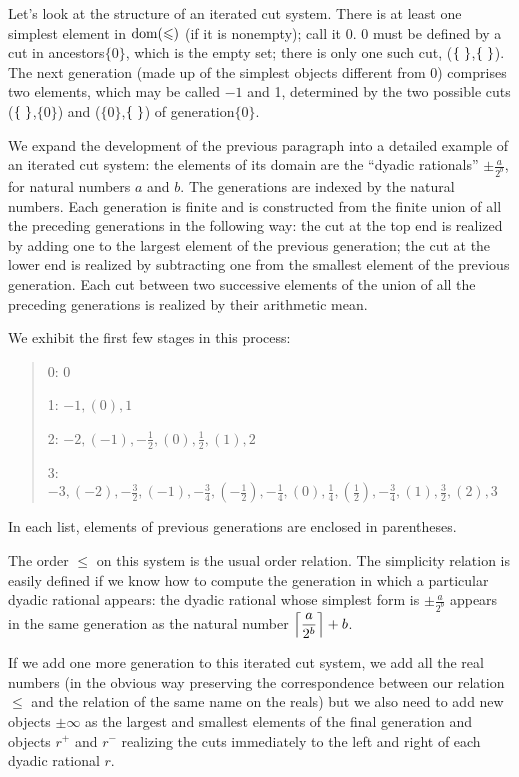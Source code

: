 Let's look at the structure of an iterated cut system.  There
is at least one simplest element in $\mathop{\mathrm{dom}}(\leqslant)$ (if it is nonempty);
call it 0.  0 must be defined by a cut in ancestors$\{0\}$, which is
the empty set; there is only one such cut,
($\mbox{$\{\;\}$}$,$\mbox{$\{\;\}$}$). The next generation (made up of the simplest objects
different from 0) comprises two elements, which may be called $-1$ and
1, determined by the two possible cuts ($\mbox{$\{\;\}$}$,$\{0\}$) and
($\{0\}$,$\mbox{$\{\;\}$}$) of generation$\{0\}$.

We expand the development of the previous paragraph into a detailed
example of an iterated cut system: the elements of its domain are the
``dyadic rationals'' $\displaystyle\pm\frac
a{2^b}$, for
natural numbers $a$ and $b$.  The generations are indexed by the natural
numbers.  Each generation is finite and is constructed from
the finite union of all
the preceding generations in the following way: the cut at the top end
is realized by adding one to the largest element of the previous
generation; the cut at the lower end is realized by subtracting one
from the smallest element of the previous generation.  Each cut
between two successive elements of the union of all the preceding
generations is realized by their arithmetic mean.

We exhibit the first few stages in this process:
\begin{quote}
 0:  0

 1:  $-1, (0), 1$

 2:  $\displaystyle -2, (-1), -\frac12, (0), \frac12, (1), 2$

 3:  $\displaystyle -3, (-2), -\frac32, (-1), -\frac34, (-\frac12), -\frac14,
 (0), \frac14,
 (\frac12), -\frac34, (1), \frac32, (2), 3$
\end{quote}

In each list, elements of previous generations are enclosed in parentheses.

The order $\leq$ on
this system is the usual order relation.  The simplicity relation is
easily defined if we know how to compute the generation in which a
particular dyadic rational appears: the dyadic
rational whose simplest form is $\displaystyle \pm\frac a{2^b}$ appears in the
same
generation as the natural number $\displaystyle\Bigl\lceil\frac a{2^b}
\Bigr\rceil +b$.

If we add one more generation to this iterated cut system, we add all
the real numbers (in the obvious way preserving the
correspondence between our relation $\leq$ and the relation of the same name on
the reals) but we also need to add new objects $\pm\infty$ as the largest
and smallest elements of the final generation and objects $r^+$ and
$r^-$ realizing the cuts immediately to the left and right of each
dyadic rational $r$.


